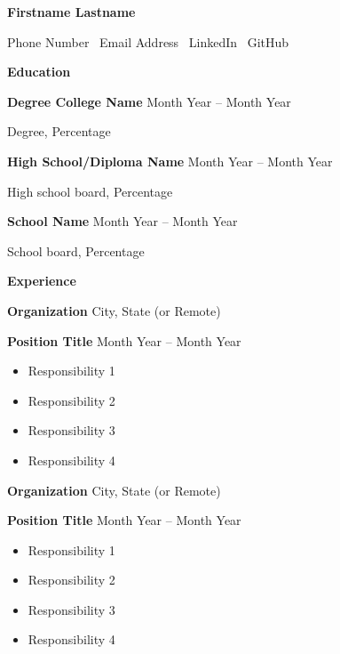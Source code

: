 \documentclass[11pt]{article}
\begin{document}
\begin{center}
    \huge{\textbf{Firstname Lastname}}\\
\end{center}
\begin{center}
    Phone Number \textbullet \ Email Address \textbullet \ LinkedIn \textbullet \ GitHub
\end{center}
\vspace{-10pt}
\hrulefill
\vspace{-2.5pt}
\begin{center}
    \Large{\textbf{Education}}
\end{center}
\textbf{Degree College Name} \hfill Month Year – Month Year

Degree, Percentage \hfill

\vspace{10pt}

\textbf{High School/Diploma Name} \hfill Month Year – Month Year

High school board, Percentage \hfill

\vspace{10pt}

\textbf{School Name} \hfill	Month Year – Month Year

School board, Percentage \hfill

\vspace{10pt}

\begin{center}
    \Large{\textbf{Experience}}
\end{center}
\textbf{Organization} \hfill City, State (or Remote)

\textbf{Position Title} \hfill Month Year – Month Year
\begin{itemize}[noitemsep, topsep=0pt, partopsep=0pt, parsep=0pt]
    \item Responsibility 1
    \item Responsibility 2
    \item Responsibility 3
    \item Responsibility 4
\end{itemize}

\vspace{10pt}

\textbf{Organization} \hfill City, State (or Remote)

\textbf{Position Title} \hfill Month Year – Month Year
\begin{itemize}[noitemsep, topsep=0pt, partopsep=0pt, parsep=0pt]
    \item Responsibility 1
    \item Responsibility 2
    \item Responsibility 3
    \item Responsibility 4
\end{itemize}
\end{document}
